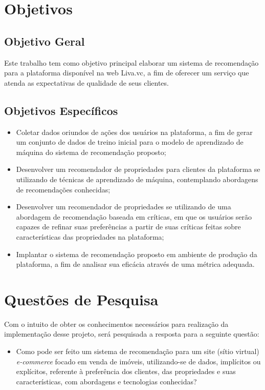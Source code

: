 \section{Objetivos}
\label{section:objetivos}

\subsection{Objetivo Geral}

Este trabalho tem como objetivo principal elaborar um sistema de recomendação para a plataforma disponível na web Liva.vc, a fim de oferecer um serviço que atenda as expectativas de qualidade de seus clientes.

\subsection{Objetivos Específicos}

\begin{itemize}
    \item Coletar dados oriundos de ações dos usuários na plataforma, a fim de gerar um conjunto de dados de treino inicial para o modelo de aprendizado de máquina do sistema de recomendação proposto;
    \item Desenvolver um recomendador de propriedades para clientes da plataforma se utilizando de técnicas de aprendizado de máquina, contemplando abordagens de recomendações conhecidas;
    \item Desenvolver um recomendador de propriedades se utilizando de uma abordagem de recomendação baseada em críticas, em que os usuários serão capazes de refinar suas preferências a partir de suas críticas feitas sobre características das propriedades na plataforma;
    \item Implantar o sistema de recomendação proposto em ambiente de produção da plataforma, a fim de analisar sua eficácia através de uma métrica adequada.
\end{itemize}

\section{Questões de Pesquisa}

Com o intuito de obter os conhecimentos necessários para realização da implementação desse projeto, será pesquisada a resposta para a seguinte questão:
\begin{itemize}
    \item Como pode ser feito um sistema de recomendação para um site (sítio virtual) \textit{e-commerce} focado em venda de imóveis, utilizando-se de dados, implícitos ou explícitos, referente à preferência dos clientes, das propriedades e suas características, com abordagens e tecnologias conhecidas?
\end{itemize}

